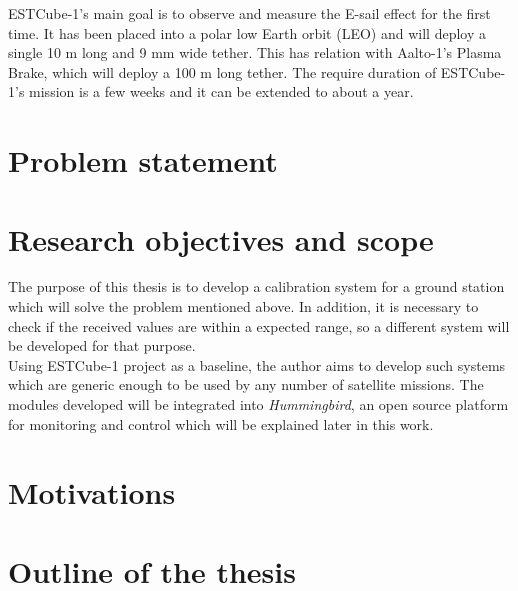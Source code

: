 ESTCube-1's main goal is to observe and measure the E-sail effect for the first time. It has been placed into a polar low Earth orbit (LEO) and will deploy a single 10 m long and 9 mm wide tether\cite{ESTCube}. This has relation with Aalto-1's Plasma Brake, which will deploy a 100 m long tether. The require duration of ESTCube-1's mission is a few weeks and it can be extended to about a year.



\section{Problem statement}\label{1.2}


\section{Research objectives and scope}

The purpose of this thesis is to develop a calibration system for a ground station which will solve the problem mentioned above. In addition, it is necessary to check if the received values are within a expected range, so a different system will be developed for that purpose.\\

Using ESTCube-1 project as a baseline, the author aims to develop such systems which are generic enough to be used by any number of satellite missions. The modules developed will be integrated into \emph{Hummingbird}, an open source platform for monitoring and control which will be explained later in this work. 





\section{Motivations}



\section{Outline of the thesis}


\newpage
